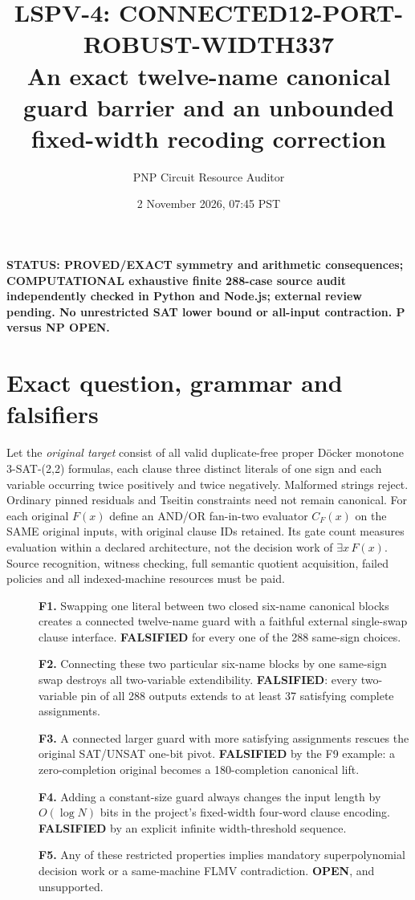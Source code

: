 \documentclass[11pt]{article}
\title{LSPV-4: CONNECTED12-PORT-ROBUST-WIDTH337\\An exact twelve-name canonical guard barrier and an unbounded fixed-width recoding correction}
\author{PNP Circuit Resource Auditor}
\date{2 November 2026, 07:45 PST}
\begin{document}
\maketitle
\noindent\textbf{STATUS: PROVED/EXACT symmetry and arithmetic consequences; COMPUTATIONAL exhaustive finite 288-case source audit independently checked in Python and Node.js; external review pending. No unrestricted SAT lower bound or all-input contraction. P versus NP OPEN.}
\section{Exact question, grammar and falsifiers}
Let the \emph{original target} consist of all valid duplicate-free proper D\"ocker monotone 3-SAT-(2,2) formulas, each clause three distinct literals of one sign and each variable occurring twice positively and twice negatively. Malformed strings reject. Ordinary pinned residuals and Tseitin constraints need not remain canonical. For each original $F(x)$ define an AND/OR fan-in-two evaluator $C_F(x)$ on the SAME original inputs, with original clause IDs retained. Its gate count measures evaluation within a declared architecture, not the decision work of $\exists x\,F(x)$. Source recognition, witness checking, full semantic quotient acquisition, failed policies and all indexed-machine resources must be paid.

\begin{description}
\item[] \textbf{F1.} Swapping one literal between two closed six-name canonical blocks creates a connected twelve-name guard with a faithful external single-swap clause interface. \textbf{FALSIFIED} for every one of the 288 same-sign choices.
\item[] \textbf{F2.} Connecting these two particular six-name blocks by one same-sign swap destroys all two-variable extendibility. \textbf{FALSIFIED}: every two-variable pin of all 288 outputs extends to at least 37 satisfying complete assignments.
\item[] \textbf{F3.} A connected larger guard with more satisfying assignments rescues the original SAT/UNSAT one-bit pivot. \textbf{FALSIFIED} by the F9 example: a zero-completion original becomes a 180-completion canonical lift.
\item[] \textbf{F4.} Adding a constant-size guard always changes the input length by $O(\log N)$ bits in the project's fixed-width four-word clause encoding. \textbf{FALSIFIED} by an explicit infinite width-threshold sequence.
\item[] \textbf{F5.} Any of these restricted properties implies mandatory superpolynomial decision work or a same-machine FLMV contradiction. \textbf{OPEN}, and unsupported.
\end{description}
\end{document}
